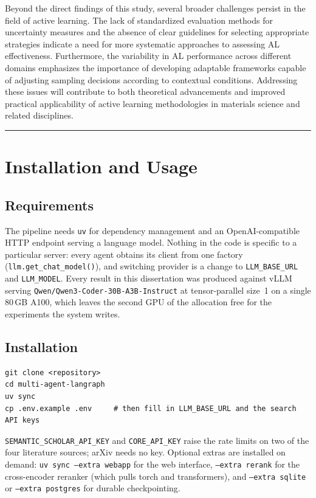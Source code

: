 Beyond the direct findings of this study, several broader challenges persist in the field of active learning. The lack of standardized evaluation methods for uncertainty measures and the absence of clear guidelines for selecting appropriate strategies indicate a need for more systematic approaches to assessing AL effectiveness. Furthermore, the variability in AL performance across different domains emphasizes the importance of developing adaptable frameworks capable of adjusting sampling decisions according to contextual conditions. Addressing these issues will contribute to both theoretical advancements and improved practical applicability of active learning methodologies in materials science and related disciplines.\endgroup

\bigskip
\hrule
\bigskip

\chapter{Installation and Usage}
\label{app:install}

\section*{Requirements}

The pipeline needs \texttt{uv} for dependency management and an
OpenAI-compatible HTTP endpoint serving a language model. Nothing in the code is
specific to a particular server: every agent obtains its client from one factory
(\texttt{llm.get\_chat\_model()}), and switching provider is a change to
\texttt{LLM\_BASE\_URL} and \texttt{LLM\_MODEL}. Every result in this
dissertation was produced against vLLM serving
\texttt{Qwen/Qwen3-Coder-30B-A3B-Instruct} at tensor-parallel size~1 on a single
80\,GB A100, which leaves the second GPU of the allocation free for the
experiments the system writes.

\section*{Installation}

\begin{lstlisting}[language={}]
git clone <repository>
cd multi-agent-langraph
uv sync
cp .env.example .env     # then fill in LLM_BASE_URL and the search API keys
\end{lstlisting}

\texttt{SEMANTIC\_SCHOLAR\_API\_KEY} and \texttt{CORE\_API\_KEY} raise the rate
limits on two of the four literature sources; arXiv needs no key. Optional
extras are installed on demand: \texttt{uv sync --extra webapp} for the web
interface, \texttt{--extra rerank} for the cross-encoder reranker (which pulls
torch and transformers), and \texttt{--extra sqlite} or \texttt{--extra
postgres} for durable checkpointing.


